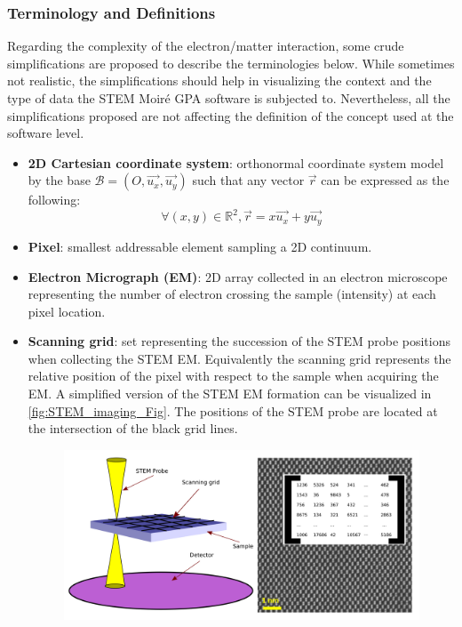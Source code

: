 \documentclass[12pt]{article}
\begin{document}
\subsubsection{Terminology and Definitions}

Regarding the complexity of the electron/matter interaction, some crude  simplifications are proposed to describe the terminologies below. While sometimes not realistic, the simplifications should help in visualizing the context and the type of data the STEM Moir{\'e} GPA software is subjected to. Nevertheless, all the simplifications proposed are not affecting the definition of the concept used at the software level.

\begin{itemize}

\item \textbf{2D Cartesian coordinate system}: orthonormal coordinate system model by the base $\mathcal{B}=(O,\vec{u_x},\vec{u_y})$ such that any vector $\vec{r}$ can be expressed as the following:
\begin{equation}
\forall (x,y) \in \mathbb{R}^{2}, \vec{r}=x\vec{u_x}+y\vec{u_y}
\end{equation}
\item \textbf{Pixel}: smallest addressable element sampling a 2D continuum.
\item \textbf{Electron Micrograph (EM)}: 2D array collected in an electron microscope representing the number of electron crossing the sample (intensity) at each pixel location.
\item \textbf{Scanning grid}: set representing the succession of the STEM probe positions when collecting the STEM EM. Equivalently the scanning grid represents the relative position of the pixel with respect to the sample when acquiring the EM. A simplified version of the 
STEM EM formation can be visualized in \cref{fig:STEM_imaging_Fig}. The positions of the STEM probe are located at the intersection of the black grid lines.
\begin{figure}[H]
\begin{center}
\includegraphics[scale=0.7]{Figures/STEM_imaging_Fig.png}

\end{center}
\end{figure}
\end{itemize}
\end{document}
